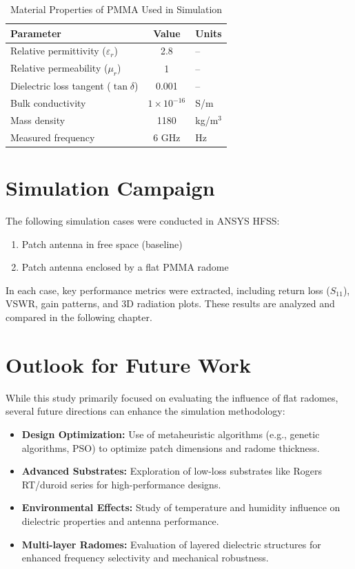 \begin{table}[H]
\centering
\caption{Material Properties of PMMA Used in Simulation}
\begin{tabular}{lcl}
\toprule
\textbf{Parameter} & \textbf{Value} & \textbf{Units} \\
\midrule
Relative permittivity ($\varepsilon_r$) & 2.8 & -- \\
Relative permeability ($\mu_r$) & 1 & -- \\
Dielectric loss tangent ($\tan\delta$) & 0.001 & -- \\
Bulk conductivity & $1 \times 10^{-16}$ & S/m \\
Mass density & 1180 & kg/m$^3$ \\
Measured frequency & 6 GHz & Hz \\
\bottomrule
\end{tabular}
\label{tab:pmma-properties}
\end{table}

\section{Simulation Campaign}

The following simulation cases were conducted in ANSYS HFSS:

\begin{enumerate}
    \item Patch antenna in free space (baseline)
    \item Patch antenna enclosed by a flat PMMA radome
\end{enumerate}

In each case, key performance metrics were extracted, including return loss ($S_{11}$), VSWR, gain patterns, and 3D radiation plots. These results are analyzed and compared in the following chapter.

\section{Outlook for Future Work}

While this study primarily focused on evaluating the influence of flat radomes, several future directions can enhance the simulation methodology:

\begin{itemize}
    \item \textbf{Design Optimization:} Use of metaheuristic algorithms (e.g., genetic algorithms, PSO) to optimize patch dimensions and radome thickness.
    \item \textbf{Advanced Substrates:} Exploration of low-loss substrates like Rogers RT/duroid series for high-performance designs.
    \item \textbf{Environmental Effects:} Study of temperature and humidity influence on dielectric properties and antenna performance.
    \item \textbf{Multi-layer Radomes:} Evaluation of layered dielectric structures for enhanced frequency selectivity and mechanical robustness.
\end{itemize}

